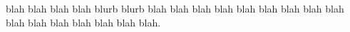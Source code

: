 \documentclass[11pt,a4paper]{article}
\begin{document}
\begin{ledgroup}
\beginnumbering

\pstart 
\noindent
 blah blah blah blah blurb blurb
blah blah blah blah blah
blah blah 
blah blah blah blah
  blah blah blah blah blah.
\pend
\endnumbering
\end{ledgroup}
\end{document}
